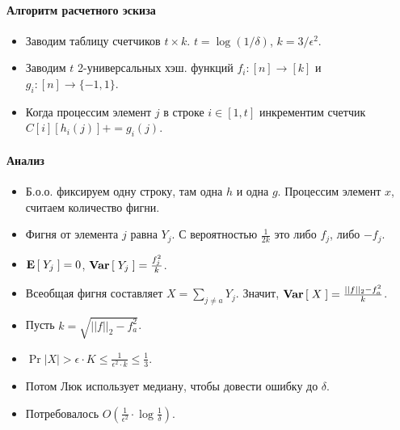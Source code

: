 \paragraph{Алгоритм расчетного эскиза} %
\label{par:count_sketch}

\begin{itemize}
	\item Заводим таблицу счетчиков $t \times k$. $t = \log(1 \slash \delta)$, $k = 3 \slash \epsilon^2$.
	\item Заводим $t$ 2-универсальных хэш. функций $f_i : [n] \rightarrow [k]$ и $g_i : [n] \rightarrow \{-1, 1\}$.
	\item Когда процессим элемент $j$ в строке $i \in [1, t]$ инкрементим счетчик $C[i][h_i(j)] += g_i(j)$.	
\end{itemize}

\paragraph{Анализ} %
\label{par:analysis_cs}

\begin{itemize}
	\item Б.о.о. фиксируем одну строку, там одна $h$ и одна $g$. Процессим элемент $x$, считаем количество фигни.
	\item Фигня от элемента $j$ равна $Y_j$. С вероятностью $\frac{1}{2k}$ это либо $f_j$, либо $-f_j$.
	\item $\textbf{E}\left[\; Y_j \;\right] = 0$, $\textbf{Var}\left[\; Y_j \;\right] = \frac{f_j^2}{k}$.
	\item Всеобщая фигня составляет $X = \sum_{j \neq a} Y_j$. Значит, $\textbf{Var}\left[\; X \;\right] = \frac{||f||_2 - f_a^2}{k}$.
	\item Пусть $k = \sqrt{||f||_2 - f_a^2}$.
	\item $\Pr{|X| > \epsilon \cdot K} \leq \frac{1}{\epsilon^2 \cdot k} \leq \frac{1}{3}$.
	\item Потом Люк использует медиану, чтобы довести ошибку до $\delta$.
	\item Потребовалось $O(\frac{1}{\epsilon^2} \cdot \log \frac{1}{\delta})$.
\end{itemize}

